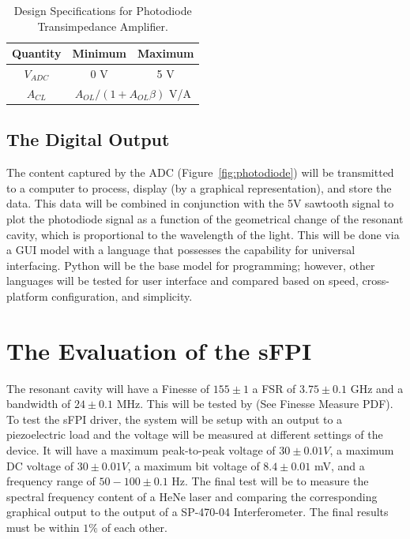 \documentclass[12pt]{report}
\begin{document}
\begin{table}[!htpb]
\begin{center}
\begin{tabular}{*3c}
\toprule 
  Quantity & Minimum & Maximum \\ 
  \midrule                   
  $V_{ADC}$ & 0 V & 5 V \\
  $A_{CL}$ & \multicolumn{2}{c}{$A_{OL}/(1+A_{OL}\beta)$ V/A}\\
  \bottomrule
\end{tabular}
\caption{Design Specifications for Photodiode Transimpedance Amplifier.}
\label{processorspecs}
\end{center}
\end{table}

\section{The Digital Output}
The content captured by the ADC (Figure~\ref{fig:photodiode}) will be transmitted to a computer to process, display (by a graphical representation), and store the data. This data will be combined in conjunction with the 5V sawtooth signal to plot the photodiode signal as a function of the geometrical change of the resonant cavity, which is proportional to the wavelength of the light. This will be done via a GUI model with a language that possesses the capability for universal interfacing. Python will be the base model for programming; however, other languages will be tested for user interface and compared based on speed, cross-platform configuration, and simplicity.

\chapter[Evaluation]{The Evaluation of the sFPI}
The resonant cavity will have a Finesse of $155 \pm 1$ a FSR of $3.75 \pm 0.1$ GHz and a bandwidth of $24 \pm 0.1$ MHz. This will be tested by (See Finesse Measure PDF). To test the sFPI driver, the system will be setup with an output to a piezoelectric load and the voltage will be measured at different settings of the device. It will have a maximum peak-to-peak voltage of $30 \pm 0.01 V$, a maximum DC voltage of $30 \pm 0.01 V$, a maximum bit voltage of $8.4 \pm 0.01$ mV, and  a frequency range of $50 - 100 \pm 0.1$ Hz. The final test will be to measure the spectral frequency content of a HeNe laser and comparing the corresponding graphical output to the output of a SP-470-04 Interferometer. The final results must be within $1\%$ of each other. 
\end{document}
